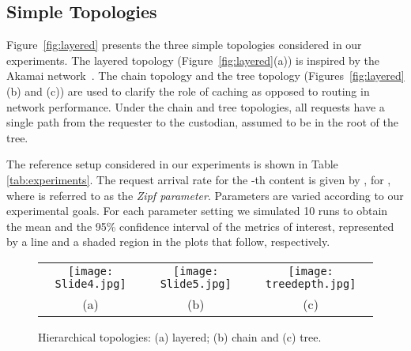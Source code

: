 
\subsection{Simple Topologies}

\label{sec:simpletop}

Figure~\ref{fig:layered} presents the three simple topologies considered in our experiments.  
The layered topology (Figure~\ref{fig:layered}(a)) is inspired  by the Akamai network~\cite{sitaraman2014overlay}.  
The chain topology and the tree topology (Figures~\ref{fig:layered}(b) and (c)) are used to clarify the 
role of caching as opposed to routing in network performance.  Under the chain and tree topologies, 
all requests have a single path from the requester to the custodian, assumed to be in the root of the tree.



The reference setup considered  in our experiments is shown in Table \ref{tab:experiments}.  
The request arrival rate for the -th content is given by , for , where  is referred to as the \emph{Zipf parameter}. 
Parameters are varied according to our experimental goals.  
For each parameter setting we simulated 10 runs to obtain the mean and the  95\% confidence interval 
of the metrics of interest, represented by
 a line and a shaded region in the plots that follow, respectively.  
  



\setlength{\tabcolsep}{0pt} 
\begin{figure}[h]
\begin{tabular}{c@{\hskip 0pt}c@{\hskip 0pt}c}
	\texttt{[image: Slide4.jpg]} & 
\hspace{-0.3in}		\texttt{[image: Slide5.jpg]} &
\hspace{-0.5in}	\texttt{[image: treedepth.jpg]} \\
(a) & \hspace{-0.3in}	(b) & \hspace{-0.5in}	(c) 
\end{tabular}
\vspace{-0.1in}
\caption{Hierarchical topologies: (a) layered; (b) chain and (c) tree. }
\label{fig:layered} \label{fig:chain}
\label{fig:treedepthtopology}
\end{figure}

